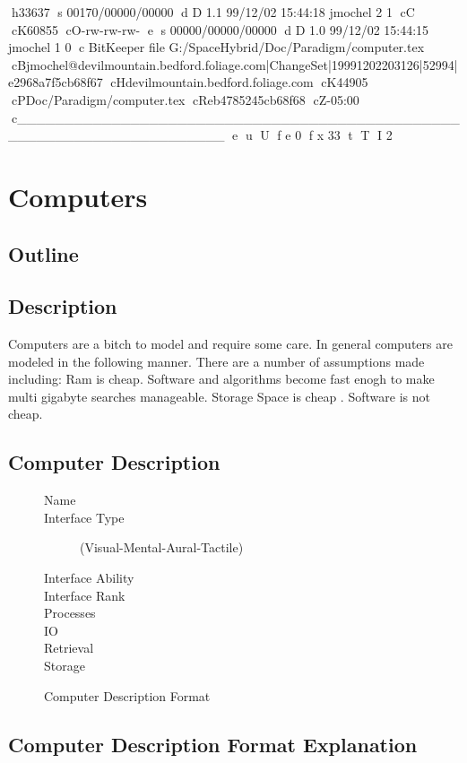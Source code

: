 h33637
s 00170/00000/00000
d D 1.1 99/12/02 15:44:18 jmochel 2 1
cC
cK60855
cO-rw-rw-rw-
e
s 00000/00000/00000
d D 1.0 99/12/02 15:44:15 jmochel 1 0
c BitKeeper file G:/SpaceHybrid/Doc/Paradigm/computer.tex
cBjmochel@devilmountain.bedford.foliage.com|ChangeSet|19991202203126|52994|e2968a7f5cb68f67
cHdevilmountain.bedford.foliage.com
cK44905
cPDoc/Paradigm/computer.tex
cReb4785245cb68f68
cZ-05:00
c______________________________________________________________________
e
u
U
f e 0
f x 33
t
T
I 2
\chapter{Computers}

\section{Outline}
\section{Description}

Computers are a bitch to model and require some care. In general computers
are modeled in the following manner. There are a number of assumptions made
including: Ram is cheap. Software and algorithms become fast enogh to make
multi gigabyte searches manageable. Storage Space is cheap . Software is not
cheap.

\section{Computer Description}


\begin{figure}[htb]
\caption{Computer Description Format}
	\begin{description}
		\item[Name]
		\item[Interface Type] (Visual-Mental-Aural-Tactile)
		\item[Interface Ability]
        \item[Interface Rank]
		\item[Processes]
		\item[IO]
		\item[Retrieval]
		\item[Storage]
	\end{description}
\end{figure}

\section{Computer Description Format Explanation}

